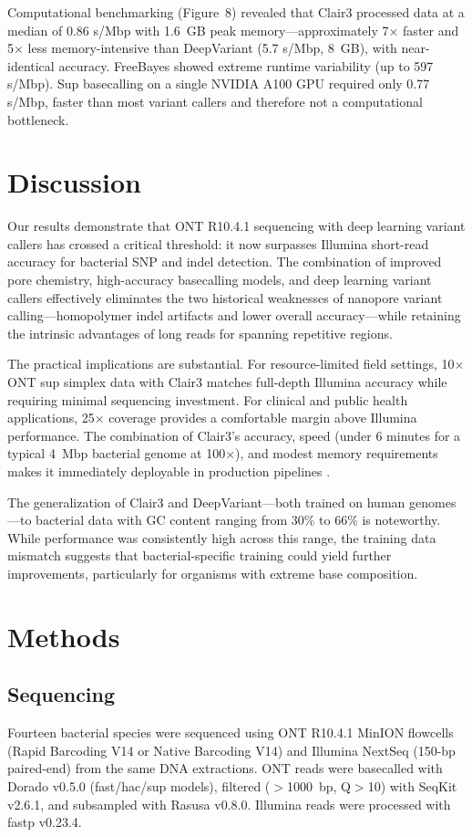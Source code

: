 \documentclass[11pt]{article}
\begin{document}
Computational benchmarking (Figure~8) revealed that Clair3 processed data at a median of 0.86 s/Mbp with 1.6~GB peak memory---approximately 7$\times$ faster and 5$\times$ less memory-intensive than DeepVariant (5.7 s/Mbp, 8~GB), with near-identical accuracy. FreeBayes showed extreme runtime variability (up to 597 s/Mbp). Sup basecalling on a single NVIDIA A100 GPU required only 0.77 s/Mbp, faster than most variant callers and therefore not a computational bottleneck.

\section{Discussion}

Our results demonstrate that ONT R10.4.1 sequencing with deep learning variant callers has crossed a critical threshold: it now surpasses Illumina short-read accuracy for bacterial SNP and indel detection. The combination of improved pore chemistry, high-accuracy basecalling models, and deep learning variant callers effectively eliminates the two historical weaknesses of nanopore variant calling---homopolymer indel artifacts and lower overall accuracy---while retaining the intrinsic advantages of long reads for spanning repetitive regions.

The practical implications are substantial. For resource-limited field settings, 10$\times$ ONT sup simplex data with Clair3 matches full-depth Illumina accuracy while requiring minimal sequencing investment. For clinical and public health applications, 25$\times$ coverage provides a comfortable margin above Illumina performance. The combination of Clair3's accuracy, speed (under 6 minutes for a typical 4~Mbp bacterial genome at 100$\times$), and modest memory requirements makes it immediately deployable in production pipelines \citep{zheng2022haplotype}.

The generalization of Clair3 and DeepVariant---both trained on human genomes---to bacterial data with GC content ranging from 30\% to 66\% is noteworthy. While performance was consistently high across this range, the training data mismatch suggests that bacterial-specific training could yield further improvements, particularly for organisms with extreme base composition.

\section{Methods}

\subsection{Sequencing}
Fourteen bacterial species were sequenced using ONT R10.4.1 MinION flowcells (Rapid Barcoding V14 or Native Barcoding V14) and Illumina NextSeq (150-bp paired-end) from the same DNA extractions. ONT reads were basecalled with Dorado v0.5.0 (fast/hac/sup models), filtered ($>$1000~bp, Q$>$10) with SeqKit v2.6.1, and subsampled with Rasusa v0.8.0. Illumina reads were processed with fastp v0.23.4.
\end{document}
